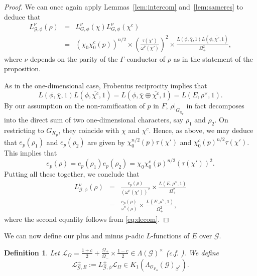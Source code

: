 \documentclass{amsart}
\newtheorem{definition}[theorem]{Definition}
\begin{document}
\begin{proof}
 We can once again apply Lemmas~\ref{lem:intercom} and~\ref{lem:sameres} to deduce that
\begin{eqnarray*}
L_{{\mathcal{G}},\phi}^\nu(\rho)&=&L^\nu_{G,\phi}(\chi)L^\nu_{G,\phi}(\chi^c)\\
&=&(\chi_0\chi_0^c(p))^{n/2}\times\left(\frac{\tau(\chi')}{\omega^\nu(\chi')}\right)^2\times \frac{L(\phi,\overline{\chi},1)L(\phi,\overline{\chi^c},1)}{\Omega_+^2},
\end{eqnarray*}
where $\nu$ depends on the parity of the $\Gamma$-conductor of $\rho$ as in the statement of the proposition.

As in the one-dimensional case, Frobenius reciprocity implies that
\[
L(\phi,\overline{\chi},1)L(\phi,\overline{\chi^c},1)=L(\phi,\overline{\chi}\oplus\overline{\chi^c},1)=L(E,\rho^\vee,1).
\]
By our assumption on the non-ramification of $p$ in $F$, $\rho|_{G_{{\mathbb Q}_p}}$ in fact decomposes into the direct sum of two one-dimensional characters, say $\rho_1$ and $\rho_2$. On restricting to $G_{K_p}$, they coincide with $\chi$ and $\chi^c$. Hence, as above, we may deduce that $e_p(\rho_1)$ and $e_p(\rho_2)$ are given by $\chi_0^{n/2}(p)\tau(\chi')$ and $\chi_0^c(p)^{n/2}\tau(\chi')$. This implies that
\[
e_p(\rho)=e_p(\rho_1)e_p(\rho_2)=\chi_0\chi_0^c(p)^{n/2}(\tau(\chi'))^2.
\]
Putting all these together, we conclude that
\begin{eqnarray*}
L_{{\mathcal{G}},\phi}^\nu(\rho)&=&\frac{e_p(\rho)}{(\omega^\nu(\chi'))^2}\times\frac{L(E,\rho^\vee,1)}{\Omega_+^2}\\
&=&\frac{e_p(\rho)}{\omega^\nu(\rho)}\times\frac{L(E,\rho^\vee,1)}{\Omega_+^2},
\end{eqnarray*}
where the second equality follows from \eqref{eq:decom}.
\end{proof}

We can now define our plus and minus $p$-adic $L$-functions of $E$ over ${\mathcal{G}}$.
\begin{definition}
Let ${\mathcal{L}}_\Omega=\frac{1+c}{2}+\frac{\Omega_+}{\Omega_-}\times \frac{1-c}{2}\in\Lambda({\mathcal{G}})^\times$ (c.f. \cite[Lemma~2.10]{bv10}). We define
\[
{\mathcal{L}}_{{\mathcal{G}},E}^\pm:=L_{{\mathcal{G}},\phi}^\pm{\mathcal{L}}_{\Omega}\in K_1(\Lambda_{{\mathcal{O}}_{F_A}}({\mathcal{G}})_{S^*}).
\]
\end{definition}
\end{document}
